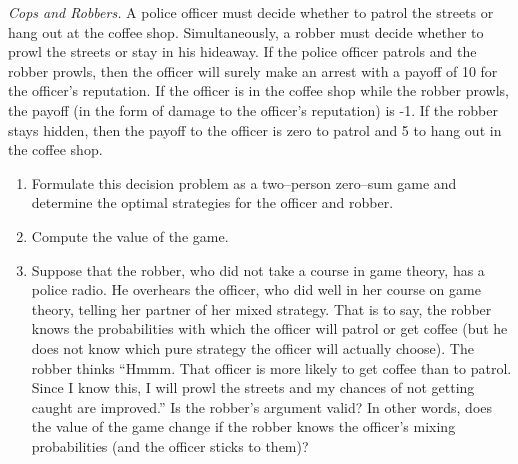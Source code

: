 \item \emph{Cops and Robbers.} A police officer must decide whether
  to patrol the streets or hang out at the coffee shop.
  Simultaneously, a robber must decide whether to prowl the streets or
  stay in his hideaway. If the police officer patrols and the robber
  prowls, then the officer will surely make an arrest with a payoff of
  10 for the officer's reputation. If the officer is in the coffee
  shop while the robber prowls, the payoff (in the form of damage to
  the officer's reputation) is -1. If the robber stays hidden, then
  the payoff to the officer is zero to patrol and 5 to hang out
  in the coffee shop.
\begin{enumerate}
\item  Formulate this decision problem as a two--person
  zero--sum game and determine the optimal strategies for the
  officer and robber.
\item Compute the value of the game. \label{val}
\item Suppose that the robber, who did not take a course in game
  theory, has a police radio. He overhears the officer, who did well
  in her course on game theory, telling her partner of her mixed
  strategy. That is to say, the robber knows the probabilities with
  which the officer will patrol or get coffee (but he does not know
  which pure strategy the officer will actually choose). The robber
  thinks ``Hmmm. That officer is more likely to get coffee than to
  patrol. Since I know this, I will prowl the streets and my chances
  of not getting caught are improved.'' Is the robber's argument
  valid? In other words, does the value of the game change if the
  robber knows the officer's mixing probabilities (and the officer
  sticks to them)? \label{knowledge}
\end{enumerate}

